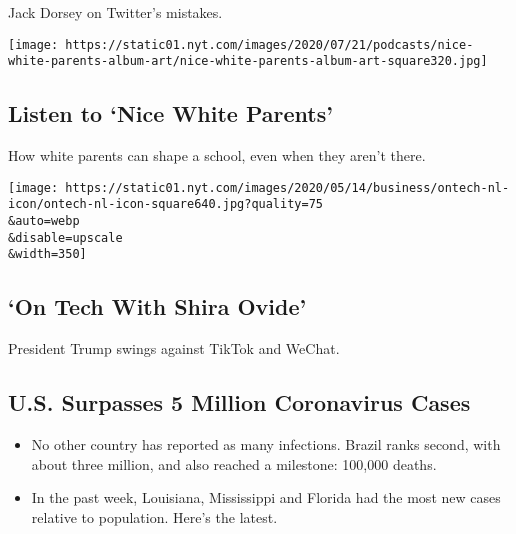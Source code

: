Jack Dorsey on Twitter's mistakes.

\href{/2020/08/06/podcasts/episode-three-this-is-our-school-how-dare-you.html}{}

\texttt{[image: https://static01.nyt.com/images/2020/07/21/podcasts/nice-white-parents-album-art/nice-white-parents-album-art-square320.jpg]}

\href{/2020/08/06/podcasts/episode-three-this-is-our-school-how-dare-you.html}{}

\hypertarget{listen-to-nice-white-parents}{%
\subsection{Listen to `Nice White
Parents'}\label{listen-to-nice-white-parents}}

How white parents can shape a school, even when they aren't there.

\href{/2020/08/07/technology/trump-tiktok-wechat.html}{}

\texttt{[image: https://static01.nyt.com/images/2020/05/14/business/ontech-nl-icon/ontech-nl-icon-square640.jpg?quality=75\\\&auto=webp\\\&disable=upscale\\\&width=350]}

\href{/2020/08/07/technology/trump-tiktok-wechat.html}{}

\hypertarget{on-tech-with-shira-ovide}{%
\subsection{`On Tech With Shira Ovide'}\label{on-tech-with-shira-ovide}}

President Trump swings against TikTok and WeChat.

\href{/2020/08/08/world/coronavirus-updates.html}{}

\hypertarget{us-surpasses-5-million-coronavirus-cases}{%
\subsection{U.S. Surpasses 5 Million Coronavirus
Cases}\label{us-surpasses-5-million-coronavirus-cases}}

\begin{itemize}
\tightlist
\item
  No other country has reported as many infections. Brazil ranks second,
  with about three million, and also reached a milestone: 100,000
  deaths.
\item
  In the past week, Louisiana, Mississippi and Florida had the most new
  cases relative to population. Here's the latest.
\end{itemize}

